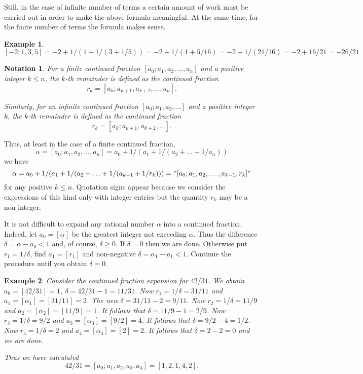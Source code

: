 \documentclass[12pt,letterpaper]{book}
\newtheorem{notation}{Notation}
\newtheorem{example}{Example}
\begin{document}
Still, in the case of infinite number of terms a certain amount of
work must be carried out in order to make the above formula
meaningful. At the same time, for the finite number of terms the
formula makes sense.

\begin{example}
$$
[-2;1,3,5] = -2 + 1/(1+1/(3+1/5)) = -2+1/(1+5/16) = -2+1/(21/16) =
-2+16/21 = -26/21
$$
\end{example}
\begin{notation}
For a finite continued fraction $ [a_0;a_1,a_2, \ldots, a_n] $ and a
positive integer $k \leq n$, the $k$-th remainder is defined as the
continued fraction
$$
r_k=[a_k;a_{k+1}, a_{k+2}, \ldots, a_n].
$$

Similarly, for an infinite  continued fraction $ [a_0;a_1,a_2,
\ldots] $ and a positive integer $k$,  the $k$-th remainder is
defined as the continued fraction
$$
r_k=[a_k;a_{k+1}, a_{k+2}, \ldots].
$$
\end{notation}

Thus, at least in the case of a finite continued fraction,
$$
\alpha=[a_0;a_1,a_2,\ldots, a_n] =a_0+1/(a_1+1/(a_2+ \ldots +1/a_n))
$$
we have
\begin{equation} \label{remainder}
\alpha =  a_0+1/(a_1+1/(a_2+ \ldots +1/(a_{k-1}+1/r_k)    )) =
"[a_0;a_1,a_2,\ldots, a_{k-1},r_k]"
\end{equation}
for any positive $k\leq n$. Quotation signs appear because we
consider the expressions of this kind only with integer entries but
the quantity $r_k$ may be a non-integer.

It is not difficult to expand any rational number $\alpha$ into a
continued fraction. Indeed, let $a_0=[\alpha]$ be the greatest
integer not exceeding $\alpha$. Thus the difference $\delta=\alpha -
a_0 <1$ and, of course, $\delta \geq 0$. If $\delta = 0$ then we are
done. Otherwise put $r_1 = 1/\delta$, find $a_1=[r_1]$ and
non-negative $\delta=\alpha_1 - a_1 <1$. Continue the procedure
until you obtain $\delta = 0$.

\begin{example}
Consider the continued fraction expansion for $42/31$. We obtain
$a_0=[42/31]=1$, $\delta = 42/31-1=11/31$.  Now $r_1=
1/\delta=31/11$ and $a_1=[\alpha_1]=[31/11]=2$. The new $\delta =
31/11-2=9/11$.  Now $r_2= 1/\delta=11/9$ and
$a_2=[\alpha_2]=[11/9]=1$. It follows that $\delta = 11/9-1 = 2/9$.
Now $r_3= 1/\delta=9/2$ and $a_3=[\alpha_3]=[9/2]=4$. It follows
that $\delta =9/2-4=1/2$. Now $r_4= 1/\delta=2$ and
$a_4=[\alpha_4]=[2]=2$. It follows that $\delta = 2-2=0$ and we are
done.
\par
Thus we have calculated
$$
42/31=[a_0;a_1,a_2,a_3,a_4] = [1;2,1,4,2].
$$
\end{example}
\end{document}
